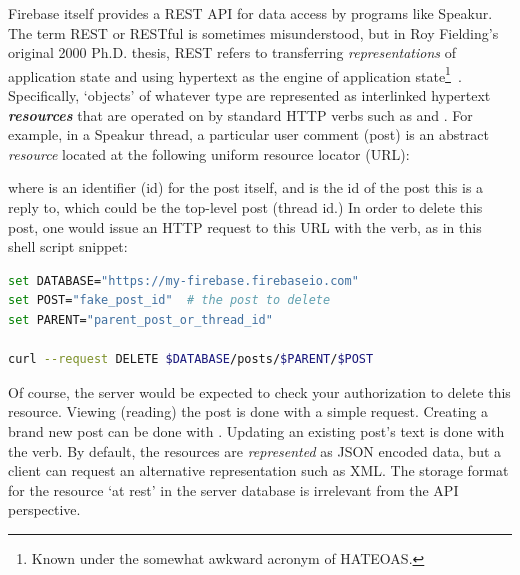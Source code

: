 Firebase itself provides a REST API for data access by programs like Speakur.
The term REST or RESTful is sometimes misunderstood,
but in Roy Fielding's original 2000 Ph.D. thesis, 
REST refers to transferring \textit{representations} of application state and using hypertext as the engine of 
application state\footnote{Known under the somewhat awkward acronym of HATEOAS.}~\cite{fielding2000}.
Specifically, `objects' of whatever type are represented as interlinked hypertext \textbf{\textit{resources}} that are operated on by standard HTTP verbs such as  and .
For example, in a Speakur thread, a particular user comment (post) is an abstract \textit{resource} located at the following uniform resource locator (URL):



where  is an identifier (id) for the post itself, and  is the id of the post this is a reply to, 
which could be the top-level post (thread id.) 
In order to delete this post, one would issue an HTTP request to this URL with the  verb, as in this  shell script snippet:

\begin{lstlisting}[language=bash,caption=
{Deleting a post with the REST API.},label=l:rest_delete,captionpos=below]
set DATABASE="https://my-firebase.firebaseio.com"
set POST="fake_post_id"  # the post to delete
set PARENT="parent_post_or_thread_id"

curl --request DELETE $DATABASE/posts/$PARENT/$POST
\end{lstlisting}

Of course, the server would be expected to check your authorization to delete this resource.
Viewing (reading) the post is done with a simple  request.
Creating a brand new post can be done with .
Updating an existing post's text is done with the  verb.
By default, the resources are \textit{represented} as JSON encoded data, 
but a client can request an alternative representation such as XML.
The storage format for the resource `at rest' in the server database is irrelevant from the API perspective.

